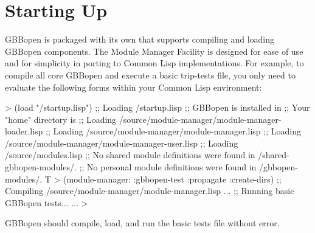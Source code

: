 \documentclass[10pt,twoside,english,pdftex]{article}
\begin{document}

\T\markright{}%
\T\pagestyle{plain}
\T\cleardoublepage
\W{}
\T\pagestyle{fancy}
\T\thispagestyle{fancybottom}
\T\global\def\fnlastname{ }%
\section{Starting Up}
\label{sec:startup}%

GBBopen is packaged with its own  that
supports compiling and loading GBBopen components.  The Module Manager Facility
is designed for ease of use and for simplicity in porting to Common Lisp
implementations.  For example, to compile all core GBBopen  and
execute a basic trip-tests file, you only need to evaluate the following forms
within your Common Lisp environment:
%
\W\supp
\begin{smallexample}
  > (load "/startup.lisp")
  ;; Loading /startup.lisp
  ;; GBBopen is installed in 
  ;; Your "home" directory is 
  ;;  Loading /source/module-manager/module-manager-loader.lisp
  ;;   Loading /source/module-manager/module-manager.lisp
  ;;     Loading /source/module-manager/module-manager-user.lisp
  ;;  Loading /source/modules.lisp
  ;; No shared module definitions were found in /shared-gbbopen-modules/.
  ;; No personal module definitions were found in /gbbopen-modules/.
  T
  > (module-manager: :gbbopen-test :propagate :create-dirs)
  ;; Compiling /source/module-manager/module-manager.lisp
       ...
  ;; Running basic GBBopen tests...
       ...
  >
\end{smallexample}
%
GBBopen should compile, load, and run the basic tests file without error.
\end{document}
